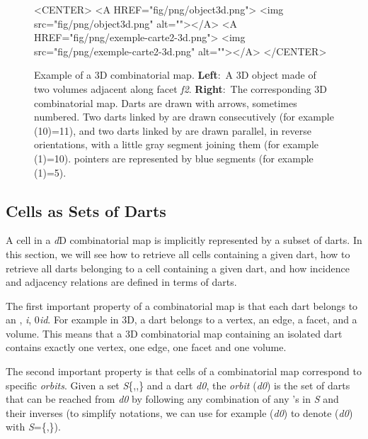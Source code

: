 \begin{figure}
\begin{ccTexOnly}
\begin{center}
    \end{center}
  \end{ccTexOnly}
  \begin{ccHtmlOnly}
    <CENTER>
    <A HREF="fig/png/object3d.png">
    <img src="fig/png/object3d.png" alt=""></A>
    <A HREF="fig/png/exemple-carte2-3d.png">
        <img src="fig/png/exemple-carte2-3d.png" alt=""></A>
    </CENTER>
    \end{ccHtmlOnly}
    \caption{Example of a 3D combinatorial map. \textbf{Left}:~A 3D object
      made of two volumes adjacent along facet \emph{f2}. \textbf{Right}:~The
      corresponding 3D combinatorial map.  Darts are drawn with
      arrows, sometimes numbered.  Two darts linked by \betaun{} are
      drawn consecutively (for example \betaun{}(10)=11), and two
      darts linked by \betadeux{} are drawn parallel, in reverse
      orientations, with a little gray segment joining them (for
      example \betadeux{}(1)=10).  \betatrois{} pointers are represented by
      blue segments (for example \betatrois{}(1)=5).}
    \label{fig-exemple-carte3d}
\end{figure}

\subsection{Cells as Sets of Darts}\label{ssec-cells-in-map}

A cell in a \emph{d}D combinatorial map is implicitly represented by a
subset of darts.
In this section, we will see how to retrieve all cells containing a
given dart, how to retrieve all darts belonging to a cell containing a
given dart, and how incidence and adjacency relations are defined in
terms of darts.

The first important property of a combinatorial map is that
each dart belongs to an , \myforall{}\emph{i}, 0\myleq{}\emph{i}\myleq{}\emph{d}.
For example in 3D, a dart belongs to a vertex, an edge, a facet, and a
volume. This means that a 3D combinatorial map containing an isolated
dart contains exactly one vertex, one edge, one facet and one volume.

The second important property is that cells of a combinatorial map
correspond to specific \emph{orbits}.  Given a set 
\emph{S}\mysubseteq{}\{\betaun{},\myldots{},\betad{}\} and a dart
\emph{d0}, the \emph{orbit} (\emph{d0}) is the set of darts that can be
reached from \emph{d0} by following any combination of any \betai{}'s in \emph{S}
and their inverses (to simplify notations, we can use for example
\orbit{\betaun{},\betaquatre{}}(\emph{d0}) to denote (\emph{d0}) with
\emph{S}=\{\betaun{},\betaquatre{}\}).


